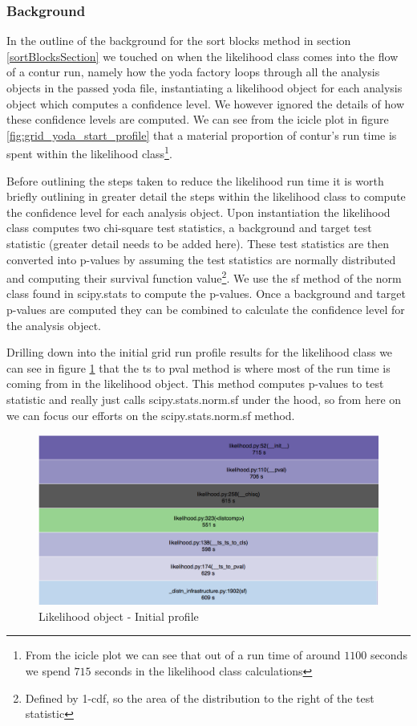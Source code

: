 \subsubsection{Background}
In the outline of the background for the sort blocks method in section \ref{sortBlocksSection} we touched on when the likelihood class comes into the flow of a contur run, namely how the yoda factory loops through all the analysis objects in the passed yoda file, instantiating a likelihood object for each analysis object which computes a confidence level. We however ignored the details of how these confidence levels are computed. We can see from the icicle plot in figure \ref{fig:grid_yoda_start_profile} that a material proportion of contur's run time is spent within the likelihood class\footnote{From the icicle plot we can see that out of a run time of around $1100$ seconds we spend $715$ seconds in the likelihood class calculations}.

Before outlining the steps taken to reduce the likelihood run time it is worth briefly outlining in greater detail the steps within the likelihood class to compute the confidence level for each analysis object. Upon instantiation the likelihood class computes two chi-square test statistics, a background and target test statistic (greater detail needs to be added here). These test statistics are then converted into p-values by assuming the test statistics are normally distributed and computing their survival function value\footnote{Defined by 1-cdf, so the area of the distribution to the right of the test statistic}. We use the sf method of the norm class found in scipy.stats to compute the p-values. Once a background and target p-values are computed they can be combined to calculate the confidence level for the analysis object.

Drilling down into the initial grid run profile results for the likelihood class we can see in figure \ref{fig:like_initial_profile} that the ts to pval method is where most of the run time is coming from in the likelihood object. This method computes p-values to test statistic and really just calls scipy.stats.norm.sf under the hood, so from here on we can focus our efforts on the scipy.stats.norm.sf method.

\begin{figure}[H]
\centering
\includegraphics[scale=0.3]{plots/likelihood_drill_down.png}
\caption{Likelihood object - Initial profile}
\label{fig:like_initial_profile}
\end{figure}


